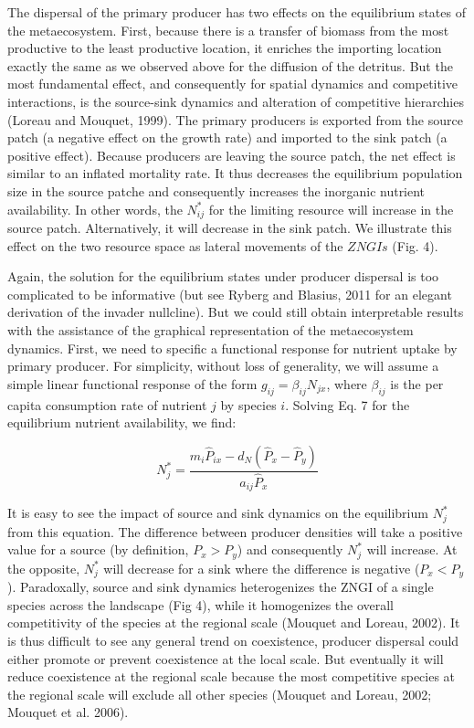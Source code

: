 \documentclass[letterpaper,twocolumn,showkeys]{revtex4-1}
\begin{document}
The dispersal of the primary producer has two effects on the equilibrium states of the metaecosystem. First, because there is a transfer of biomass from the most productive to the least productive location, it enriches the importing location exactly the same as we observed above for the diffusion of the detritus. But the most fundamental effect, and consequently for spatial dynamics and competitive interactions, is the source-sink dynamics and alteration of competitive hierarchies (Loreau and Mouquet, 1999). The primary producers is exported from the source patch (a negative effect on the growth rate) and imported to the sink patch (a positive effect). Because producers are leaving the source patch, the net effect is similar to an inflated mortality rate. It thus decreases the equilibrium population size in the source patche and consequently increases the inorganic nutrient availability. In other words, the $N^*_{ij}$ for the limiting resource will increase in the source patch. Alternatively, it will decrease in the sink patch. We illustrate this effect on the two resource space as lateral movements of the $ZNGIs$ (Fig. 4).

Again, the solution for the equilibrium states under producer dispersal is too complicated to be informative (but see Ryberg and Blasius, 2011 for an elegant derivation of the invader nullcline). But we could still obtain interpretable results with the assistance of the graphical representation of the metaecosystem dynamics. First, we need to specific a functional response for nutrient uptake by primary producer. For simplicity, without loss of generality, we will assume a simple linear functional response of the form $g_{ij} = \beta_{ij}N_{jx}$, where $\beta_{ij}$ is the per capita consumption rate of nutrient $j$ by species $i$. Solving Eq. 7 for the equilibrium nutrient availability, we find:

\begin{equation}
	\label{e:bnet}
	N^{*}_{j}=\frac{m_{i}\widehat{P}_{ix}-d_{N}(\widehat{P}_{x}-\widehat{P}_{y})}{a_{ij}\widehat{P}_{x}}
\end{equation}

It is easy to see the impact of source and sink dynamics on the equilibrium $N^{*}_{j}$ from this equation. The difference between producer densities will take a positive value for a source (by definition, $P_x>P_y$) and consequently $N^{*}_{j}$ will increase. At the opposite, $N^{*}_{j}$ will decrease for a sink where the difference is negative ($P_x<P_y$). Paradoxally, source and sink dynamics heterogenizes the ZNGI of a single species across the landscape (Fig 4), while it homogenizes the overall competitivity of the species at the regional scale (Mouquet and Loreau, 2002). It is thus difficult to see any general trend on coexistence, producer dispersal could either promote or prevent coexistence at the local scale. But eventually it will reduce coexistence at the regional scale because the most competitive species at the regional scale will exclude all other species (Mouquet and Loreau, 2002; Mouquet et al. 2006).  
\end{document}
